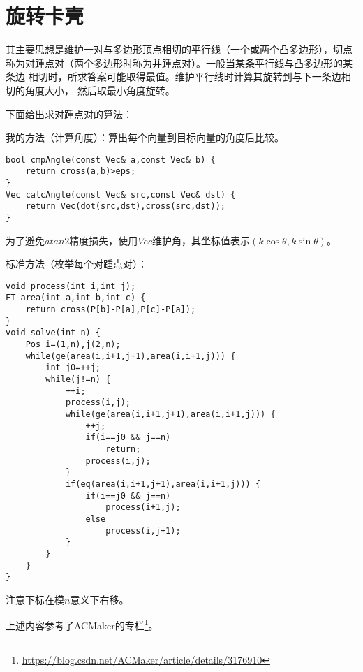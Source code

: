 \section{旋转卡壳}
其主要思想是维护一对与多边形顶点相切的平行线（一个或两个凸多边形），切点
称为对踵点对（两个多边形时称为并踵点对）。一般当某条平行线与凸多边形的某条边
相切时，所求答案可能取得最值。维护平行线时计算其旋转到与下一条边相切的角度大小，
然后取最小角度旋转。

下面给出求对踵点对的算法：

我的方法（计算角度）：算出每个向量到目标向量的角度后比较。
\begin{lstlisting}
bool cmpAngle(const Vec& a,const Vec& b) {
    return cross(a,b)>eps;
}
Vec calcAngle(const Vec& src,const Vec& dst) {
    return Vec(dot(src,dst),cross(src,dst));
}
\end{lstlisting}

为了避免$atan2$精度损失，使用$Vec$维护角，其坐标值表示$(k\cos \theta,k\sin \theta)$。

标准方法（枚举每个对踵点对）：
\begin{lstlisting}
void process(int i,int j);
FT area(int a,int b,int c) {
    return cross(P[b]-P[a],P[c]-P[a]);
}
void solve(int n) {
    Pos i=(1,n),j(2,n);
    while(ge(area(i,i+1,j+1),area(i,i+1,j))) {
        int j0=++j;
        while(j!=n) {
            ++i;
            process(i,j);
            while(ge(area(i,i+1,j+1),area(i,i+1,j))) {
                ++j;
                if(i==j0 && j==n)
                    return;
                process(i,j);
            }
            if(eq(area(i,i+1,j+1),area(i,i+1,j))) {
                if(i==j0 && j==n)
                    process(i+1,j);
                else
                    process(i,j+1);
            }
        }
    }
}
\end{lstlisting}
注意下标在模$n$意义下右移。


上述内容参考了ACMaker的专栏\footnote{
	\url{https://blog.csdn.net/ACMaker/article/details/3176910}
}。
